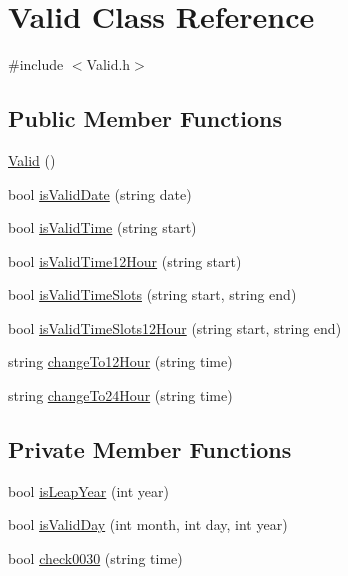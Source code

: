 \hypertarget{class_valid}{}\section{Valid Class Reference}
\label{class_valid}


{\ttfamily \#include $<$Valid.\+h$>$}

\subsection*{Public Member Functions}
\begin{DoxyCompactItemize}
\item 
\hyperlink{class_valid_a0876f57435d6e17ed7c6ffa6c3b5eca3}{Valid} ()
\item 
bool \hyperlink{class_valid_a1a8c6ac97f62977d8c52ff61d16d28a0}{is\+Valid\+Date} (string date)
\item 
bool \hyperlink{class_valid_a92d98d38c516edf66ded92649cdacf1c}{is\+Valid\+Time} (string start)
\item 
bool \hyperlink{class_valid_aeada5eb3cd07ce6e00631f0eeca0108b}{is\+Valid\+Time12\+Hour} (string start)
\item 
bool \hyperlink{class_valid_a918ee40ddd9c14a1e24b29bd18b0e874}{is\+Valid\+Time\+Slots} (string start, string end)
\item 
bool \hyperlink{class_valid_ac1e28f85325a5d29d1dd9bfff809a07f}{is\+Valid\+Time\+Slots12\+Hour} (string start, string end)
\item 
string \hyperlink{class_valid_a13660c1b7d6f13d756d8371f2fd50860}{change\+To12\+Hour} (string time)
\item 
string \hyperlink{class_valid_a6ca76e5fe10bc356a2bef22216ba3403}{change\+To24\+Hour} (string time)
\end{DoxyCompactItemize}
\subsection*{Private Member Functions}
\begin{DoxyCompactItemize}
\item 
bool \hyperlink{class_valid_a710d1da68dfdeb36e8581224783e6e4a}{is\+Leap\+Year} (int year)
\item 
bool \hyperlink{class_valid_a3abb63c2d1863364967272e3d33e7ba3}{is\+Valid\+Day} (int month, int day, int year)
\item 
bool \hyperlink{class_valid_ac00909d3e4041ccdbbfda3d3a796c53a}{check0030} (string time)
\end{DoxyCompactItemize}


